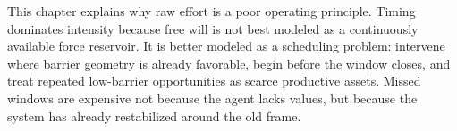 \begin{summarybox}
This chapter explains why raw effort is a poor operating principle. Timing
dominates intensity because free will is not best modeled as a continuously
available force reservoir. It is better modeled as a scheduling problem:
intervene where barrier geometry is already favorable, begin before the window
closes, and treat repeated low-barrier opportunities as scarce productive
assets. Missed windows are expensive not because the agent lacks values, but
because the system has already restabilized around the old frame.
\end{summarybox}
